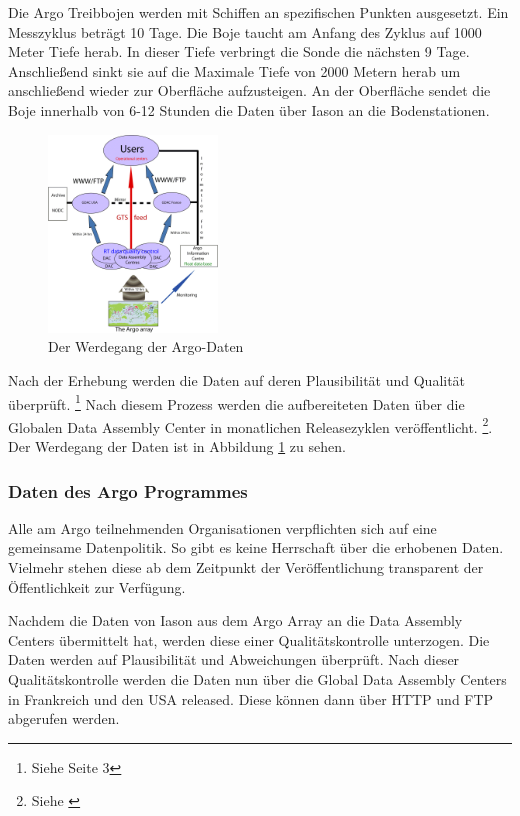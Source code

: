     Die Argo Treibbojen werden mit Schiffen an spezifischen Punkten ausgesetzt. Ein Messzyklus beträgt 10 Tage. Die Boje taucht am Anfang des Zyklus auf 1000 Meter Tiefe herab.  In dieser Tiefe verbringt die Sonde die nächsten 9 Tage. Anschließend sinkt sie auf die Maximale Tiefe von 2000 Metern herab um anschließend wieder zur Oberfläche aufzusteigen. An der Oberfläche sendet die Boje innerhalb von 6-12 Stunden die Daten über Iason an die Bodenstationen.
   
    \begin{figure}[!ht]
        \centering
        \includegraphics[width=0.4\textwidth]{pix/RT-Data-flow}
        \caption[Der Werdegang der Argo-Daten - Bildquelle: http://www.argo.ucsd.edu]{Der Werdegang der Argo-Daten}
        \label{fig:argo_dataflow}
    \end{figure}
    
    Nach der Erhebung werden die Daten auf deren Plausibilität und Qualität überprüft. \footnote{Siehe \cite{ArgoDataBeginnersGuide} Seite 3} Nach diesem Prozess werden die aufbereiteten Daten über die Globalen Data Assembly Center in monatlichen Releasezyklen veröffentlicht. \footnote{Siehe \cite{Argofloa92:online}}. Der Werdegang der Daten ist in Abbildung \ref{fig:argo_dataflow} zu sehen.

\subsubsection{Daten des Argo Programmes}
    

    Alle am Argo teilnehmenden Organisationen verpflichten sich auf eine gemeinsame Datenpolitik. So gibt es keine Herrschaft über die erhobenen Daten. Vielmehr stehen diese ab dem Zeitpunkt der Veröffentlichung transparent der Öffentlichkeit zur Verfügung.
    
    Nachdem die Daten von Iason aus dem Argo Array an die Data Assembly Centers übermittelt hat, werden diese einer Qualitätskontrolle unterzogen. Die Daten werden auf Plausibilität und Abweichungen überprüft. Nach dieser Qualitätskontrolle werden die Daten nun über die Global Data Assembly Centers in Frankreich und den USA released. Diese können dann über HTTP und FTP abgerufen werden. 
    
